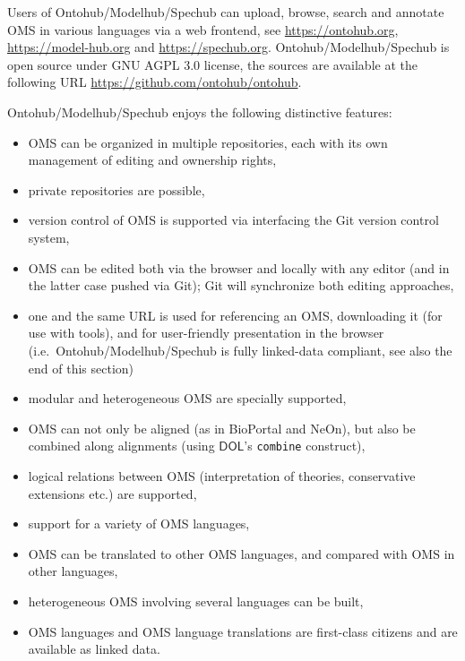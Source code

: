 \documentclass[10pt, a4paper]{isov2}
\newcommand*{\syntax}[1]{\texttt{#1}}
\newcommand*{\DOL}{\ensuremath{\mathsf{DOL}}\xspace}
\begin{document}
Users of Ontohub/Modelhub/Spechub can upload, browse, search and annotate 
OMS in various languages via a web frontend, 
see \url{https://ontohub.org}, \url{https://model-hub.org} and \url{https://spechub.org}.
Ontohub/Modelhub/Spechub is open source under GNU AGPL 3.0 license,  the sources are available at the following URL 
\url{https://github.com/ontohub/ontohub}.

Ontohub/Modelhub/Spechub enjoys the following distinctive features:
\begin{itemize}
  \item OMS can be organized in multiple repositories, each
     with its own management of editing and ownership rights,
  \item private repositories are possible,
  \item version control of OMS is supported via interfacing
   the Git version control system,
  \item OMS can be edited both via the browser and locally with any
  editor (and in the latter case pushed via Git); Git will synchronize both editing approaches,
  \item one and the same URL is used for referencing an OMS, downloading
     it (for use with tools), and for user-friendly presentation in
     the browser (i.e.\ Ontohub/Modelhub/Spechub is fully linked-data compliant,  see also the end of this section)
  \item modular and heterogeneous OMS are specially supported,
  \item OMS can not only be aligned (as in BioPortal and NeOn), but also be combined along alignments (using \DOL's \syntax{combine} construct),
  \item logical relations between OMS (interpretation of theories, conservative
  extensions etc.) are supported,
  \item support for a variety of OMS languages, 
  \item OMS can be translated to other OMS languages, and compared with
   OMS in other languages,
  \item heterogeneous OMS involving several languages can be built,
  \item OMS languages and OMS language translations are first-class
   citizens and are available as linked data.
\end{itemize}
\end{document}

